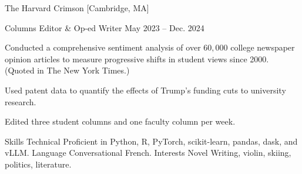\documentclass[11pt,a4paper]{article}
\begin{document}
\Entry
    {The Harvard Crimson}
    [Cambridge, MA]
    {
        \Position
            {Columns Editor \& Op-ed Writer}
            {May 2023 -- Dec. 2024}
            {
                \item Conducted a comprehensive sentiment analysis of over $60,000$ college newspaper opinion articles to measure progressive shifts in student views since 2000. (Quoted in The New York Times.)
                \item Used patent data to quantify the effects of Trump's funding cuts to university research.
                \item Edited three student columns and one faculty column per week.
            }
    }
\SectionHeader
    {Skills}
\SkillEntry
    {Technical}
    {Proficient in Python, R, PyTorch, scikit-learn, pandas, dask, and vLLM.}
\SkillEntry
    {Language}
    {Conversational French.}
\SkillEntry
    {Interests}
    {Novel Writing, violin, skiing, politics, literature.}
\end{document}
